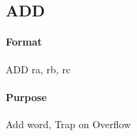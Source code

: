 \subsection{ADD}


\paragraph{Format} ADD ra, rb, rc

\paragraph{Purpose} Add word, Trap on Overflow
